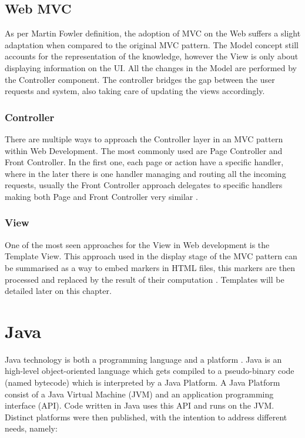 \subsection{Web MVC}

As per Martin Fowler \cite{Fowler2003PatternsArchitecture} definition, the adoption of MVC on the Web suffers a slight adaptation when compared to the original MVC pattern. The Model concept still accounts for the representation of the knowledge, however the View is only about displaying information on the UI. All the changes in the Model are performed by the Controller component. The controller bridges the gap between the user requests and system, also taking care of updating the views accordingly.

\subsubsection{Controller}

There are multiple ways to approach the Controller layer in an MVC pattern within Web Development. The most commonly used are Page Controller and Front Controller. In the first one, each page or action have a specific handler, where in the later there is one handler managing and routing all the incoming requests, usually the Front Controller approach delegates to specific handlers making both Page and Front Controller very similar \cite{Fowler2003PatternsArchitecture}. 

\subsubsection{View}

One of the most seen approaches for the View in Web development is the Template View. This approach used in the display stage of the MVC pattern can be summarised as a way to embed markers in HTML files, this markers are then processed and replaced by the result of their computation \cite{Fowler2003PatternsArchitecture}. Templates will be detailed later on this chapter.

\section{Java}

Java technology is both a programming language and a platform \cite{firstcup}. Java is an high-level object-oriented language which gets compiled to a pseudo-binary code (named bytecode) which is interpreted by a Java Platform. A Java Platform consist of a Java Virtual Machine (JVM) and an application programming interface (API). Code written in Java uses this API and runs on the JVM. Distinct platforms   were then published, with the intention to address different needs, namely:

